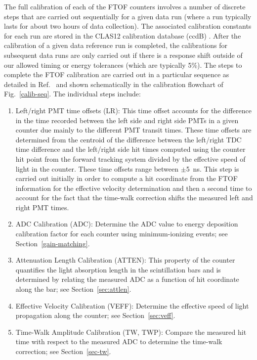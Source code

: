 \documentclass[3p,times,twocolumn]{elsarticle}
\begin{document}
The full calibration of each of the FTOF counters involves a number of discrete steps that are carried out
sequentially for a given data run (where a run typically lasts for about two hours of data collection). The
associated calibration constants for each run are stored in the CLAS12 calibration database (ccdB)
\cite{recon-nim}. After the calibration of a given data reference run is completed, the calibrations for
subsequent data runs are only carried out if there is a response shift outside of our allowed timing or
energy tolerances (which are typically 5\%). The steps to complete the FTOF calibration are carried out in
a particular sequence as detailed in Ref.~\cite{ftof-calib} and shown schematically in the calibration flowchart
of Fig.~\ref{calib-seq}. The individual steps include:

\begin{enumerate}
\item Left/right PMT time offsets (LR): This time offset accounts for the difference in the time recorded
between the left side and right side PMTs in a given counter due mainly to the different PMT transit times.
These time offsets are determined from the centroid of the difference between the left/right TDC time
difference and the left/right side hit times computed using the counter hit point from the forward tracking
system divided by the effective speed of light in the counter. These time offsets range between $\pm$5~ns.
This step is carried out initially in order to compute a hit coordinate from the FTOF information for the
effective velocity determination and then a second time to account for the fact that the time-walk correction
shifts the measured left and right PMT times.

\item ADC Calibration (ADC): Determine the ADC value to energy deposition calibration factor for each counter
using minimum-ionizing events; see Section~\ref{gain-matching}.

\item Attenuation Length Calibration (ATTEN): This property of the counter quantifies the light absorption
length in the scintillation bars and is determined by relating the measured ADC as a function of hit coordinate
along the bar; see Section~\ref{sec:attlen}.

\item Effective Velocity Calibration (VEFF): Determine the effective speed of light propagation along the counter;
see Section~\ref{sec:veff}.

\item Time-Walk Amplitude Calibration (TW, TWP): Compare the measured hit time with respect to the measured
ADC to determine the time-walk correction; see Section~\ref{sec-tw}.
  

\end{enumerate}
\end{document}
